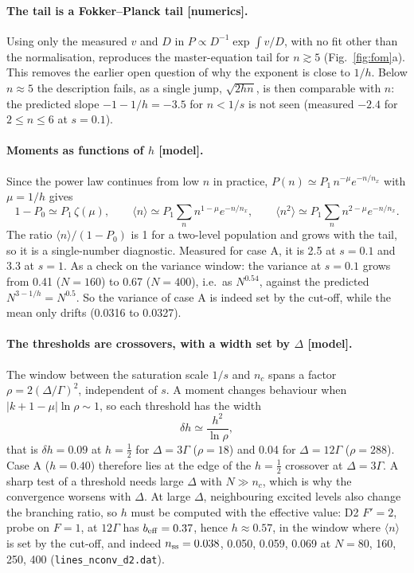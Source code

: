 \documentclass[11pt,a4paper]{article}
\begin{document}
\paragraph{The tail is a Fokker--Planck tail [numerics].} Using only the measured $v$ and $D$ in $P\propto D^{-1}\exp\int v/D$, with no fit other than the normalisation, reproduces the master-equation tail for $n\gtrsim5$ (Fig.~\ref{fig:fom}a). This removes the earlier open question of why the exponent is close to $1/h$. Below $n\approx5$ the description fails, as a single jump, $\sqrt{2hn}$, is then comparable with $n$: the predicted slope $-1-1/h=-3.5$ for $n<1/s$ is not seen (measured $-2.4$ for $2\le n\le6$ at $s=0.1$).

\paragraph{Moments as functions of $h$ [model].} Since the power law continues from low $n$ in practice, $P(n)\simeq P_1\,n^{-\mu}e^{-n/n_x}$ with $\mu=1/h$ gives
\begin{equation}
  1-P_0\simeq P_1\,\zeta(\mu),\qquad
  \langle n\rangle\simeq P_1\sum_n n^{1-\mu}e^{-n/n_x},\qquad
  \langle n^2\rangle\simeq P_1\sum_n n^{2-\mu}e^{-n/n_x}.
\end{equation}
The ratio $\langle n\rangle/(1-P_0)$ is 1 for a two-level population and grows with the tail, so it is a single-number diagnostic. Measured for case A, it is 2.5 at $s=0.1$ and 3.3 at $s=1$. As a check on the variance window: the variance at $s=0.1$ grows from 0.41 ($N=160$) to 0.67 ($N=400$), i.e.\ as $N^{0.54}$, against the predicted $N^{3-1/h}=N^{0.5}$. So the variance of case A is indeed set by the cut-off, while the mean only drifts (0.0316 to 0.0327).

\paragraph{The thresholds are crossovers, with a width set by $\Delta$ [model].} The window between the saturation scale $1/s$ and $n_c$ spans a factor $\rho=2(\Delta/\Gamma)^2$, independent of $s$. A moment changes behaviour when $|k+1-\mu|\ln\rho\sim1$, so each threshold has the width
\begin{equation}
  \delta h\simeq\frac{h^2}{\ln\rho} ,
  \label{eq:width}
\end{equation}
that is $\delta h=0.09$ at $h=\tfrac12$ for $\Delta=3\Gamma$ ($\rho=18$) and 0.04 for $\Delta=12\Gamma$ ($\rho=288$). Case A ($h=0.40$) therefore lies at the edge of the $h=\tfrac12$ crossover at $\Delta=3\Gamma$. A sharp test of a threshold needs large $\Delta$ with $N\gg n_c$, which is why the convergence worsens with $\Delta$. At large $\Delta$, neighbouring excited levels also change the branching ratio, so $h$ must be computed with the effective value: D2 $F'=2$, probe on $F=1$, at $12\Gamma$ has $b_{\rm eff}=0.37$, hence $h\approx0.57$, in the window where $\langle n\rangle$ is set by the cut-off, and indeed $n_{\rm ss}=0.038$, 0.050, 0.059, 0.069 at $N=80$, 160, 250, 400 (\texttt{lines\_nconv\_d2.dat}).
\end{document}
